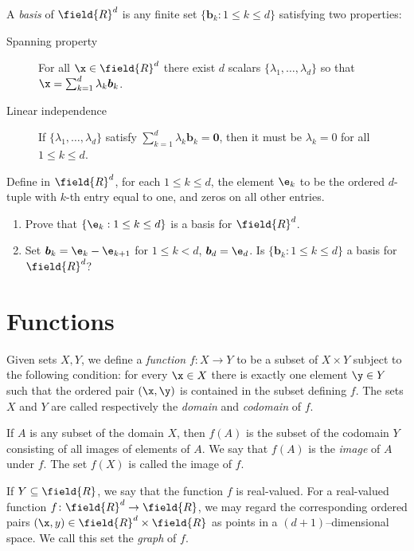 A \emph{basis} of $\field{R}^d$ is any finite set $\{ \boldsymbol{b}_k : 1\leq k \leq d \}$ satisfying two properties:
\begin{description}
\item [Spanning property] For all $\x \in \field{R}^d$ there exist $d$ scalars $\{ \lambda_1, \dotsc, \lambda_d \}$ so that $\x = \sum_{k=1}^d \lambda_k \boldsymbol{b}_k$.
\item [Linear independence] If $\{ \lambda_1, \dotsc, \lambda_d\}$ satisfy $\sum_{k=1}^d \lambda_k \boldsymbol{b}_k = \boldsymbol{0}$, then it must be $\lambda_k=0$ for all $1\leq k \leq d$.
\end{description}

\begin{problem}\label{problem:basisRd}
Define in $\field{R}^d$, for each $1\leq k \leq d$, the element $\e_k$ to be the ordered $d$-tuple with $k$-th entry equal to one, and zeros on all other entries.
\begin{enumerate}
	\item Prove that $\{ \e_k : 1\leq k \leq d\}$ is a basis for $\field{R}^d$.
	\item Set $\boldsymbol{b}_k = \e_k - \e_{k+1}$ for $1\leq k < d$, $\boldsymbol{b}_d = \e_d$.  Is $\{ \boldsymbol{b}_k : 1\leq k \leq d\}$ a basis for $\field{R}^d$?
\end{enumerate}
\end{problem}

\section{Functions}

Given sets $X, Y$, we define a \emph{function} $f\colon X \to Y$ to be a subset of $X \times Y$ subject to the following condition: for every $\x \in X$ there is exactly one element $\y \in Y$ such that the ordered pair $(\x, \y)$ is contained in the subset defining $f$. The sets $X$ and $Y$ are called respectively the \emph{domain} and \emph{codomain} of $f$.  

If $A$ is any subset of the domain $X$, then $f(A)$ is the subset of the codomain $Y$ consisting of all images of elements of $A$. We say that $f(A)$ is the \emph{image} of $A$ under $f$. The set $f(X)$ is called the image of $f$.

If $Y \subseteq \field{R}$, we say that the function $f$ is real-valued.  For a real-valued function $f\colon \field{R}^d \to \field{R}$, we may regard the corresponding ordered pairs $(\x, y) \in \field{R}^d\times\field{R}$ as points in a $(d+1)$--dimensional space.  We call this set the \emph{graph} of $f$.

